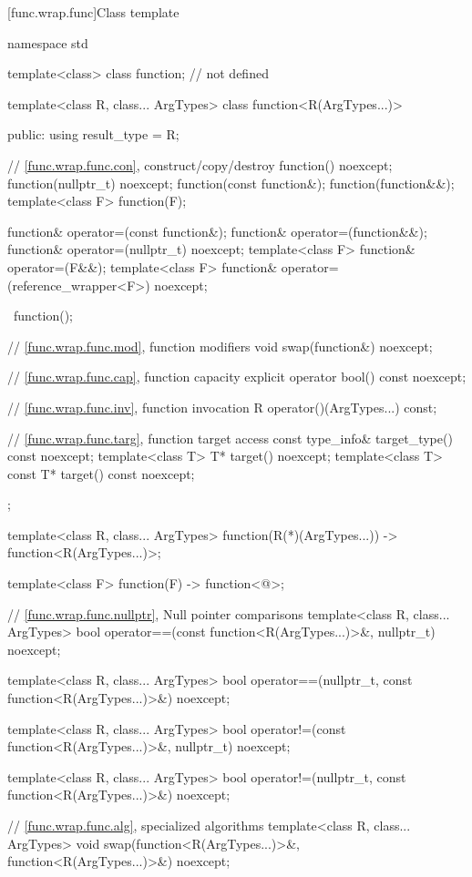 [func.wrap.func]{Class template }
%

\begin{codeblock}
namespace std {
  template<class> class function; // not defined

  template<class R, class... ArgTypes>
  class function<R(ArgTypes...)> {
  public:
    using result_type = R;

    // \ref{func.wrap.func.con}, construct/copy/destroy
    function() noexcept;
    function(nullptr_t) noexcept;
    function(const function&);
    function(function&&);
    template<class F> function(F);

    function& operator=(const function&);
    function& operator=(function&&);
    function& operator=(nullptr_t) noexcept;
    template<class F> function& operator=(F&&);
    template<class F> function& operator=(reference_wrapper<F>) noexcept;

    ~function();

    // \ref{func.wrap.func.mod}, function modifiers
    void swap(function&) noexcept;

    // \ref{func.wrap.func.cap}, function capacity
    explicit operator bool() const noexcept;

    // \ref{func.wrap.func.inv}, function invocation
    R operator()(ArgTypes...) const;

    // \ref{func.wrap.func.targ}, function target access
    const type_info& target_type() const noexcept;
    template<class T>       T* target() noexcept;
    template<class T> const T* target() const noexcept;
  };

  template<class R, class... ArgTypes>
    function(R(*)(ArgTypes...)) -> function<R(ArgTypes...)>;

  template<class F> function(F) -> function<@\seebelow@>;

  // \ref{func.wrap.func.nullptr}, Null pointer comparisons
  template<class R, class... ArgTypes>
    bool operator==(const function<R(ArgTypes...)>&, nullptr_t) noexcept;

  template<class R, class... ArgTypes>
    bool operator==(nullptr_t, const function<R(ArgTypes...)>&) noexcept;

  template<class R, class... ArgTypes>
    bool operator!=(const function<R(ArgTypes...)>&, nullptr_t) noexcept;

  template<class R, class... ArgTypes>
    bool operator!=(nullptr_t, const function<R(ArgTypes...)>&) noexcept;

  // \ref{func.wrap.func.alg}, specialized algorithms
  template<class R, class... ArgTypes>
    void swap(function<R(ArgTypes...)>&, function<R(ArgTypes...)>&) noexcept;
}
\end{codeblock}

